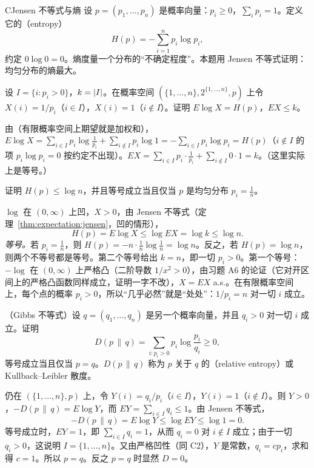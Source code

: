 \begin{probleme}{C}{Jensen 不等式与熵}
设 $p=(p_1,\dots,p_n)$ 是概率向量：$p_i\geqslant0$，$\sum_ip_i=1$。定义它的（entropy）
\[
H(p)=-\sum_{i=1}^np_i\log p_i,
\]
约定 $0\log0=0$。熵度量一个分布的“不确定程度”。本题用 Jensen 不等式证明：均匀分布的熵最大。
\begin{questions}
\item 设 $I=\{i:p_i>0\}$，$k=\lvert I\rvert$。在概率空间 $(\{1,\dots,n\},2^{\{1,\dots,n\}},p)$ 上令 $X(i)=1/p_i$（$i\in I$），$X(i)=1$（$i\notin I$）。证明 $E\log X=H(p)$，$EX\leqslant k$。
\begin{solution}
由（有限概率空间上期望就是加权和），$E\log X=\sum_{i\in I}p_i\log\frac1{p_i}+\sum_{i\notin I}p_i\log1=-\sum_{i\in I}p_i\log p_i=H(p)$（$i\notin I$ 的项 $p_i\log p_i=0$ 按约定不出现）。$EX=\sum_{i\in I}p_i\cdot\frac1{p_i}+\sum_{i\notin I}0\cdot1=k$。（这里实际上是等号。）
\end{solution}

\item 证明 $H(p)\leqslant\log n$，并且等号成立当且仅当 $p$ 是均匀分布 $p_i=\frac1n$。
\begin{solution}
$\log$ 在 $(0,\infty)$ 上凹，$X>0$，由 Jensen 不等式（定理~\ref{thm:expectation:jensen}，凹的情形），
\[
H(p)=E\log X\leqslant\log EX=\log k\leqslant\log n .
\]
\emph{等号。}若 $p_i=\frac1n$，则 $H(p)=-n\cdot\frac1n\log\frac1n=\log n$。反之，若 $H(p)=\log n$，则两个不等号都是等号。第二个等号给出 $k=n$，即一切 $p_i>0$。第一个等号：$-\log$ 在 $(0,\infty)$ 上严格凸（二阶导数 $1/x^2>0$），由习题 A6 的论证（它对开区间上的严格凸函数同样成立，证明一字不改），$X=EX$ a.s.。在有限概率空间上，每个点的概率 $p_i>0$，所以“几乎必然”就是“处处”：$1/p_i=n$ 对一切 $i$ 成立。
\end{solution}

\item （Gibbs 不等式）设 $q=(q_1,\dots,q_n)$ 是另一个概率向量，并且 $q_i>0$ 对一切 $i$ 成立。证明
\[
D(p\,\|\,q)=\sum_{i:p_i>0}p_i\log\frac{p_i}{q_i}\geqslant0,
\]
等号成立当且仅当 $p=q$。$D(p\,\|\,q)$ 称为 $p$ 关于 $q$ 的（relative entropy）或 Kullback--Leibler 散度。
\begin{solution}
仍在 $(\{1,\dots,n\},p)$ 上，令 $Y(i)=q_i/p_i$（$i\in I$），$Y(i)=1$（$i\notin I$）。则 $Y>0$，$-D(p\,\|\,q)=E\log Y$，而 $EY=\sum_{i\in I}q_i\leqslant1$。由 Jensen 不等式，
\[
-D(p\,\|\,q)=E\log Y\leqslant\log EY\leqslant\log1=0 .
\]
等号成立时，$EY=1$，即 $\sum_{i\in I}q_i=1$，从而 $q_i=0$ 对 $i\notin I$ 成立；由于一切 $q_i>0$，这说明 $I=\{1,\dots,n\}$。又由严格凹性（同 C2），$Y$ 是常数，$q_i=cp_i$，求和得 $c=1$。所以 $p=q$。反之 $p=q$ 时显然 $D=0$。


\end{solution}
\end{questions}
\end{probleme}
